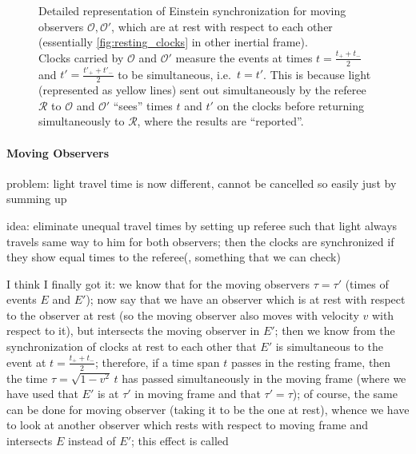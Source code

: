 \begin{figure}
{
}

\caption{Detailed representation of Einstein synchronization for moving observers $\mathcal{O}, \mathcal{O}'$, which are at rest with respect to each other (essentially \ref{fig:resting_clocks} in other inertial frame).\\
Clocks carried by $\mathcal{O}$ and $\mathcal{O}'$ measure the events at times $t = \frac{t_+ + t_-}{2}$ and $t' = \frac{t'_+ + t'_-}{2}$ to be simultaneous, i.e.~$t = t'$. This is because light (represented as yellow lines) sent out simultaneously by the referee $\mathcal{R}$ to $\mathcal{O}$ and $\mathcal{O}'$ \enquote{sees} times $t$ and $t'$ on the clocks before returning simultaneously to $\mathcal{R}$, where the results are \enquote{reported}.}
\label{fig:moving_clocks_resting_wrt_each_other}
\end{figure}




			\paragraph{Moving Observers}
problem: light travel time is now different, cannot be cancelled so easily just by summing up

idea: eliminate unequal travel times by setting up referee such that light always travels same way to him for both observers; then the clocks are synchronized if they show equal times to the referee(, something that we can check)


I think I finally got it: we know that for the moving observers $\tau = \tau'$ (times of events $E$ and $E'$); now say that we have an observer which is at rest with respect to the observer at rest (so the moving observer also moves with velocity $v$ with respect to it), but intersects the moving observer in $E'$; then we know from the synchronization of clocks at rest to each other that $E'$ is simultaneous to the event at $t = \frac{t_+ + t_-}{2}$; therefore, if a time span $t$ passes in the resting frame, then the time $\tau = \sqrt{1 - v^2} \, t$ has passed simultaneously in the moving frame (where we have used that $E'$ is at $\tau'$ in moving frame and that $\tau' = \tau$); of course, the same can be done for moving observer (taking it to be the one at rest), whence we have to look at another observer which rests with respect to moving frame and intersects $E$ instead of $E'$; this effect is called 

